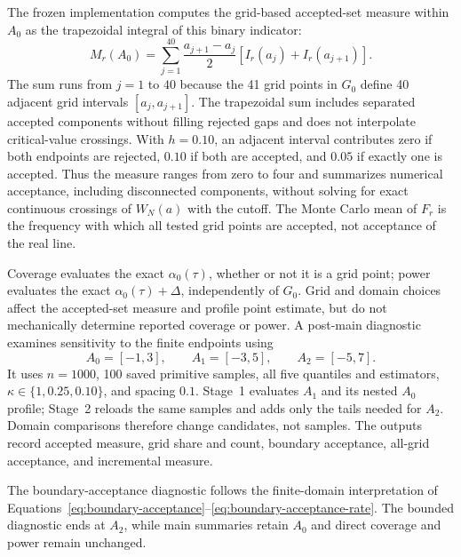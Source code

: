 The frozen implementation computes the grid-based accepted-set measure within $A_0$ as the trapezoidal integral of this binary indicator:
\begin{equation}
  M_r(A_0)
  =\sum_{j=1}^{40}\frac{a_{j+1}-a_j}{2}
    \left[I_r(a_j)+I_r(a_{j+1})\right].
  \label{eq:accepted-measure}
\end{equation}
The sum runs from $j=1$ to $40$ because the 41 grid points in $G_0$ define 40 adjacent grid intervals $[a_j,a_{j+1}]$. The trapezoidal sum includes separated accepted components without filling rejected gaps and does not interpolate critical-value crossings. With $h=0.10$, an adjacent interval contributes zero if both endpoints are rejected, $0.10$ if both are accepted, and $0.05$ if exactly one is accepted. Thus the measure ranges from zero to four and summarizes numerical acceptance, including disconnected components, without solving for exact continuous crossings of $W_N(a)$ with the cutoff. The Monte Carlo mean of $F_r$ is the frequency with which all tested grid points are accepted, not acceptance of the real line.

Coverage evaluates the exact $\alpha_0(\tau)$, whether or not it is a grid point; power evaluates the exact $\alpha_0(\tau)+\Delta$, independently of $G_0$. Grid and domain choices affect the accepted-set measure and profile point estimate, but do not mechanically determine reported coverage or power. A post-main diagnostic examines sensitivity to the finite endpoints using
\begin{equation}
  A_0=[-1,3],\qquad A_1=[-3,5],\qquad A_2=[-5,7].
  \label{eq:grid-diagnostic-domains}
\end{equation}
It uses $n=1000$, 100 saved primitive samples, all five quantiles and estimators, $\kappa\in\{1,0.25,0.10\}$, and spacing $0.1$. Stage~1 evaluates $A_1$ and its nested $A_0$ profile; Stage~2 reloads the same samples and adds only the tails needed for $A_2$. Domain comparisons therefore change candidates, not samples. The outputs record accepted measure, grid share and count, boundary acceptance, all-grid acceptance, and incremental measure.

The boundary-acceptance diagnostic follows the finite-domain interpretation of Equations~\eqref{eq:boundary-acceptance}--\eqref{eq:boundary-acceptance-rate}. The bounded diagnostic ends at $A_2$, while main summaries retain $A_0$ and direct coverage and power remain unchanged.
